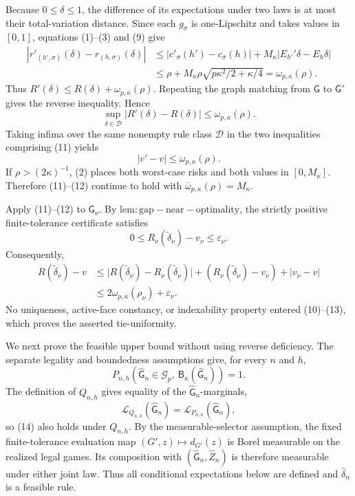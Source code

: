 Because \(0\leq\delta\leq1\), the difference of its expectations under two laws is at most their total-variation distance. Since each \(g_{\sigma}\) is one-Lipschitz and takes values in \([0,1]\), equations (1)--(3) and (9) give
\[
 \begin{aligned}
 \left\lvert r'_{(h',\sigma)}(\delta)-r_{(h,\sigma)}(\delta)\right\rvert
 &\leq \left\lvert c'_{\sigma}(h')-c_{\sigma}(h)\right\rvert
   +M_{\kappa}
   \left\lvert E_{h'}'\delta-E_h\delta\right\rvert\\
 &\leq\rho+M_{\kappa}\rho
 \sqrt{p\kappa^2/2+\kappa/4}
 =\omega_{p,\kappa}(\rho). 
 \end{aligned} \tag{10}
\]
Thus \(R'(\delta)\leq R(\delta)+\omega_{p,\kappa}(\rho)\). Repeating the graph matching from \(\mathsf G\) to \(\mathsf G'\) gives the reverse inequality. Hence
\[
 \sup_{\delta\in\mathcal D}
 \lvert R'(\delta)-R(\delta)\rvert
 \leq\omega_{p,\kappa}(\rho). \tag{11}
\]
Taking infima over the same nonempty rule class \(\mathcal D\) in the two inequalities comprising (11) yields
\[
 \lvert v'-v\rvert\leq\omega_{p,\kappa}(\rho). \tag{12}
\]
If \(\rho>(2\kappa)^{-1}\), (2) places both worst-case risks and both values in \([0,M_{\kappa}]\). Therefore (11)--(12) continue to hold with \(\overline\omega_{p,\kappa}(\rho)=M_{\kappa}\).

Apply (11)--(12) to \(\mathsf G_{\nu}\). By \(\mathrm{lem:gap-near-optimality}\), the strictly positive finite-tolerance certificate satisfies
\[
 0\leq R_{\nu}(\widetilde\delta_{\nu})-v_{\nu}
 \leq\varepsilon_{\nu}.
\]
Consequently,
\[
 \begin{aligned}
 R(\widetilde\delta_{\nu})-v
 &\leq \lvert R(\widetilde\delta_{\nu})
              -R_{\nu}(\widetilde\delta_{\nu})\rvert
 +(R_{\nu}(\widetilde\delta_{\nu})-v_{\nu})
 +\lvert v_{\nu}-v\rvert\\
 &\leq2\omega_{p,\kappa}(\rho_{\nu})+\varepsilon_{\nu}.
 \end{aligned} \tag{13}
\]
No uniqueness, active-face constancy, or indexability property entered (10)--(13), which proves the asserted tie-uniformity.

We next prove the feasible upper bound without using reverse deficiency. The separate legality and boundedness assumptions give, for every \(n\) and \(h\),
\[
 P_{n,h}\!\left(
 \widehat{\mathsf G}_n\in\mathcal G_p,
 \ \mathsf B_{\kappa}(\widehat{\mathsf G}_n)
 \right)=1. \tag{14}
\]
The definition of \(Q_{n,h}\) gives equality of the \(\widehat{\mathsf G}_n\)-marginals,
\[
 \mathcal L_{Q_{n,h}}(\widehat{\mathsf G}_n)
 =\mathcal L_{P_{n,h}}(\widehat{\mathsf G}_n), \tag{15}
\]
so (14) also holds under \(Q_{n,h}\). By the measurable-selector assumption, the fixed finite-tolerance evaluation map \((G',z)\mapsto d_{G'}(z)\) is Borel measurable on the realized legal games. Its composition with \((\widehat{\mathsf G}_n,\widehat Z_n)\) is therefore measurable under either joint law. Thus all conditional expectations below are defined and \(\widehat\delta_n\) is a feasible rule.

